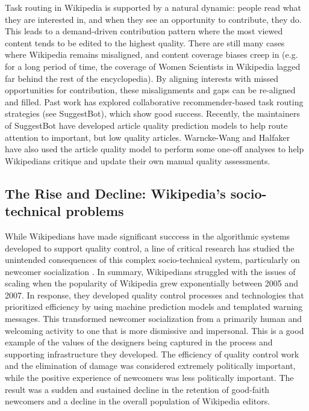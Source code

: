  Task routing in Wikipedia is supported by a natural dynamic: people read what they are interested in, and when they see an opportunity to contribute, they do.  This leads to a demand-driven contribution pattern where the most viewed content tends to be edited to the highest quality\cite{hill2014consider}.  There are still many cases where Wikipedia remains misaligned\cite{wang2015misalignment}, and content coverage biases creep in (e.g. for a long period of time, the coverage of Women Scientists in Wikipedia lagged far behind the rest of the encyclopedia\cite{halfaker2017interpolating}).  By aligning interests with missed opportunities for contribution, these misalignments and gaps can be re-aligned and filled.  Past work has explored collaborative recommender-based task routing strategies (see SuggestBot\cite{cosley2007suggestbot}), which show good success.  Recently, the maintainers of SuggestBot have developed article quality prediction models to help route attention to important, but low quality articles\cite{wang2013tell}.  Warncke-Wang and Halfaker have also used the article quality model to perform some one-off analyses to help Wikipedians critique and update their own manual quality assessments\cite{wang2014screening}.

\subsection{The Rise and Decline: Wikipedia's socio-technical problems}
While Wikipedians have made significant succcess in the algorithmic systems developed to support quality control, a line of critical research has studied the unintended consequences of this complex socio-technical system, particularly on newcomer socialization \cite{halfaker2013rise}\cite{morgan2013tea}\cite{halfaker2014snuggle}.  In summary, Wikipedians struggled with the issues of scaling when the popularity of Wikipedia grew exponentially between 2005 and 2007\cite{halfaker2013rise}.  In response, they developed quality control processes and technologies that prioritized efficiency by using machine prediction models\cite{halfaker2014snuggle} and templated warning messages\cite{halfaker2013rise}.  This transformed newcomer socialization from a primarily human and welcoming activity to one that is more dismissive and impersonal\cite{morgan2013tea}.  This is a good example of the values of the designers being captured in the process and supporting infrastructure they developed\cite{halfaker2014snuggle}.  The efficiency of quality control work and the elimination of damage was considered extremely politically important, while the positive experience of newcomers was less politically important.  The result was a sudden and sustained decline in the retention of good-faith newcomers and a decline in the overall population of Wikipedia editors\cite{halfaker2013rise}.

